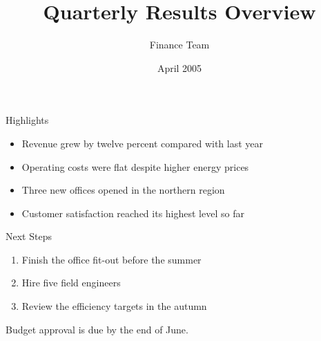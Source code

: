 \documentclass{beamer}
\title{Quarterly Results Overview}
\author{Finance Team}
\date{April 2005}
\begin{document}
\frame{\titlepage}
\begin{frame}{Highlights}
\begin{itemize}
\item Revenue grew by twelve percent compared with last year
\item Operating costs were flat despite higher energy prices
\item Three new offices opened in the northern region
\item Customer satisfaction reached its highest level so far
\end{itemize}
\end{frame}
\begin{frame}{Next Steps}
\begin{enumerate}
\item Finish the office fit-out before the summer
\item Hire five field engineers
\item Review the efficiency targets in the autumn
\end{enumerate}
\alert{Budget approval is due by the end of June.}
\end{frame}
\end{document}
